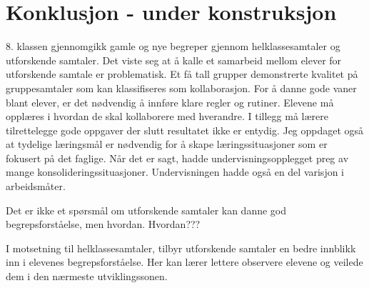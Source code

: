 \documentclass[main.tex]{subfiles}
\begin{document}
\section*{Konklusjon - under konstruksjon}
\label{sec:4}

8. klassen gjennomgikk gamle og nye begreper gjennom helklassesamtaler og utforskende 
samtaler. Det viste seg at å kalle et samarbeid mellom elever for utforskende samtale
er problematisk. Et få tall grupper demonstrerte kvalitet på gruppesamtaler som kan
klassifiseres som kollaborasjon. For å danne gode vaner blant elever, er det nødvendig 
å innføre klare regler og rutiner. Elevene må opplæres i hvordan de skal kollaborere 
med hverandre. I tillegg må lærere tilrettelegge gode oppgaver der slutt resultatet 
ikke er entydig. Jeg oppdaget også at tydelige læringsmål er nødvendig for å skape 
læringssituasjoner som er fokusert på det faglige. Når det er sagt, hadde 
undervisningsopplegget preg av mange konsolideringssituasjoner. Undervisningen hadde 
også en del varisjon i arbeidsmåter. 

Det er ikke et spørsmål om utforskende samtaler kan danne god begrepsforståelse, men 
hvordan. Hvordan???

I motsetning til helklassesamtaler, tilbyr utforskende samtaler en bedre innblikk
inn i elevenes begrepsforståelse. Her kan lærer lettere observere elevene og veilede
dem i den nærmeste utviklingssonen.
\end{document}
